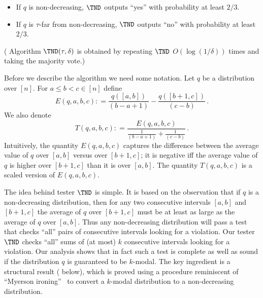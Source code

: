 \begin{itemize}
\item If $q$ is non-decreasing, $\TND$ outputs ``yes'' with probability at least $2/3$.
\vspace{-0.1cm}
\item If $q$ is $\tau$-far from non-decreasing, $\TND$ outputs ``no'' with probability at least $2/3$.
\end{itemize}
%
\noindent (%
Algorithm
$\TND(\tau, \delta)$ is obtained by repeating $\TND$ $O(\log(1/\delta))$ times and taking the majority vote.)


\medskip

Before we describe the algorithm we need some notation. Let $q$ be a distribution over $[n]$. 
For $a \le b < c \in [n]$ define $$E(q, a, b, c) : = \frac{q([a,b])}{(b-a+1)} - \frac{q([b+1,c])}{(c-b)}\,.$$
We also denote $$T(q, a, b, c) : = \frac{E(q, a, b, c)}{\frac{1}{(b-a+1)} + \frac{1}{(c-b)}}\,.$$
Intuitively, the quantity $E(q,a,b,c)$ captures the difference
between the average value of $q$ over $[a,b]$ versus over $[b+1,c]$;
it is negative iff the average value of $q$ is higher over $[b+1,c]$
than it is over $[a,b]$.  The quantity $T(q,a,b,c)$ is a scaled
version of $E(q,a,b,c)$.


{The idea behind tester $\TND$ is simple.  It is based on the
observation that if $q$ is a non-decreasing distribution,
then for any two consecutive intervals $[a,b]$ and $[b+1,c]$
the average of $q$ over $[b+1,c]$ must be at least as large
as the average of $q$ over $[a,b]$.  Thus any non-decreasing
distribution will pass a test that checks ``all'' pairs of
consecutive intervals looking for a violation. Our tester $\TND$ checks ``all'' sums of (at most) $k$ consecutive intervals looking for a violation. Our analysis
shows that in fact such a test is complete as well as sound if the
distribution $q$ is guaranteed to be $k$-modal.  The key ingredient
is a structural result ( below), which is proved using a procedure
reminiscent of ``Myerson ironing''~\cite{Myerson:81} to convert a $k$-modal
distribution to a non-decreasing distribution.}

